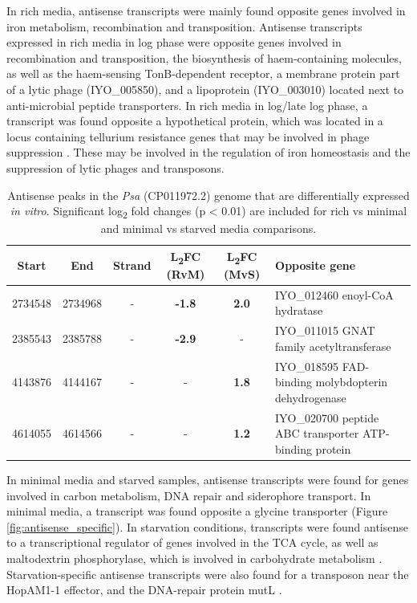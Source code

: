 In rich media, antisense transcripts were mainly found opposite genes involved in iron metabolism, recombination and transposition. Antisense transcripts expressed in rich media in log phase were opposite genes involved in recombination and transposition, the biosynthesis of haem-containing molecules, as well as the haem-sensing TonB-dependent receptor, a membrane protein part of a lytic phage (IYO\_005850), and a lipoprotein (IYO\_003010) located next to anti-microbial peptide transporters. In rich media in log/late log phase, a transcript was found opposite a hypothetical protein, which was located in a locus containing tellurium resistance genes that may be involved in phage suppression \citep{Anantharaman2012-zj}. These may be involved in the regulation of iron homeostasis and the suppression of lytic phages and transposons.
 \hfill
\begin{table}[H]
    \footnotesize
    \centering
    \begin{tabular}{cccccp{6cm}}\toprule
Start &  End & Strand & L\textsubscript{2}FC (RvM) & L\textsubscript{2}FC (MvS) & Opposite gene\\\midrule
 2734548 & 2734968 & -	& \textbf{-1.8} & \textbf{2.0} & IYO_012460 enoyl-CoA hydratase \\
 2385543 & 2385788 & -	& \textbf{-2.9} & - & IYO_011015 GNAT family acetyltransferase \\
 4143876 & 4144167 & -	& - & \textbf{1.8} & IYO_018595 FAD-binding molybdopterin dehydrogenase \\
 4614055 & 4614566 & -	& - & \textbf{1.2} & IYO_020700 peptide ABC transporter ATP-binding protein\\
\bottomrule
    \end{tabular}
    \caption[Antisense peaks that are differentially expressed \textit{in vitro}]{Antisense peaks in the \textit{Psa} (CP011972.2) genome that are differentially expressed \textit{in vitro}. Significant log\textsubscript{2} fold changes (p < 0.01) are included for rich vs minimal and minimal vs starved media comparisons. }
    \label{tab:antisense_sig}
\end{table}

In minimal media and starved samples, antisense transcripts were found for genes involved in carbon metabolism, DNA repair and siderophore transport. In minimal media, a transcript was found opposite a glycine transporter (Figure \ref{fig:antisense_specific}). In starvation conditions, transcripts were found antisense to a transcriptional regulator of genes involved in the TCA cycle, as well as maltodextrin phosphorylase, which is involved in carbohydrate metabolism \citep{Watson1997-gq}. Starvation-specific antisense transcripts were also found for a transposon near the HopAM1-1 effector, and the DNA-repair protein mutL \citep{Ban1998-js}. 

